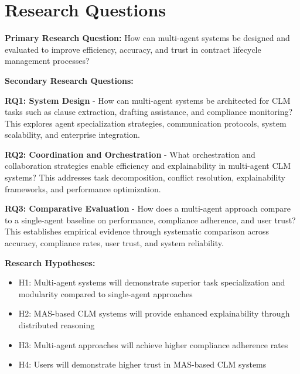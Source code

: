 
\chapter{Research Questions}\label{chapter:research_questions}

\textbf{Primary Research Question:} How can multi-agent systems be designed and evaluated to improve efficiency, accuracy, and trust in contract lifecycle management processes?

\textbf{Secondary Research Questions:}

\textbf{RQ1: System Design} - How can multi-agent systems be architected for CLM tasks such as clause extraction, drafting assistance, and compliance monitoring? This explores agent specialization strategies, communication protocols, system scalability, and enterprise integration.

\textbf{RQ2: Coordination and Orchestration} - What orchestration and collaboration strategies enable efficiency and explainability in multi-agent CLM systems? This addresses task decomposition, conflict resolution, explainability frameworks, and performance optimization.

\textbf{RQ3: Comparative Evaluation} - How does a multi-agent approach compare to a single-agent baseline on performance, compliance adherence, and user trust? This establishes empirical evidence through systematic comparison across accuracy, compliance rates, user trust, and system reliability.

\textbf{Research Hypotheses:}
\begin{itemize}
    \item H1: Multi-agent systems will demonstrate superior task specialization and modularity compared to single-agent approaches
    \item H2: MAS-based CLM systems will provide enhanced explainability through distributed reasoning
    \item H3: Multi-agent approaches will achieve higher compliance adherence rates
    \item H4: Users will demonstrate higher trust in MAS-based CLM systems
\end{itemize}
